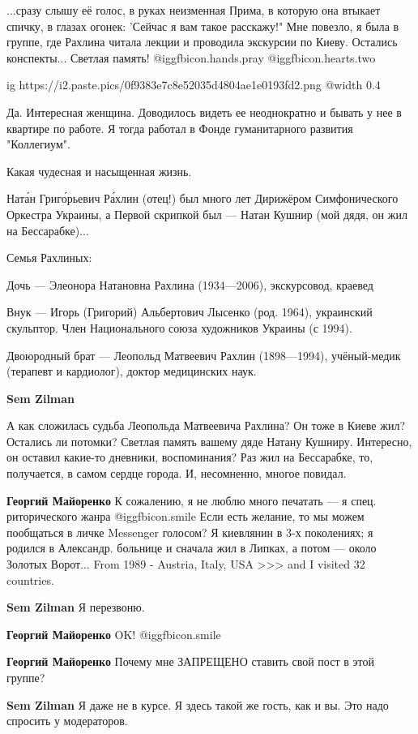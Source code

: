 \begin{itemize}

...сразу слышу её голос, в руках неизменная Прима, в которую она втыкает спичку, в глазах огонек: 'Сейчас я вам такое расскажу!"
Мне повезло, я была в группе, где Рахлина читала лекции и проводила экскурсии по Киеву. Остались конспекты...
Светлая память! @igg{fbicon.hands.pray}  @igg{fbicon.hearts.two} 


\ifcmt
  ig https://i2.paste.pics/0f9383e7c8e52035d4804ae1e0193fd2.png
  @width 0.4
\fi


Да. Интересная женщина. Доводилось видеть ее неоднократно и бывать у нее в
квартире по работе. Я тогда работал в Фонде гуманитарного развития "Коллегиум".


Какая чудесная и насыщенная жизнь.


Ната́н Григо́рьевич Ра́хлин (отец!) был много лет Дирижёром Симфонического
Оркестра Украины, а Первой скрипкой был — Натан Кушнир (мой дядя, он жил на
Бессарабке)...

Семья Рахлиных:

Дочь — Элеонора Натановна Рахлина (1934—2006), экскурсовод, краевед

Внук — Игорь (Григорий) Альбертович Лысенко (род. 1964), украинский скульптор.
Член Национального союза художников Украины (с 1994).

Двоюродный брат — Леопольд Матвеевич Рахлин (1898—1994), учёный-медик (терапевт
и кардиолог), доктор медицинских наук.

\begin{itemize} %
\textbf{Sem Zilman} 

А как сложилась судьба Леопольда Матвеевича Рахлина? Он тоже в Киеве жил?
Остались ли потомки? Светлая память вашему дяде Натану Кушниру. Интересно, он
оставил какие-то дневники, воспоминания? Раз жил на Бессарабке, то, получается,
в самом сердце города. И, несомненно, многое повидал.


\textbf{Георгий Майоренко} К сожалению, я не люблю много печатать — я спец. риторического жанра  @igg{fbicon.smile} 
Если есть желание, то мы можем пообщаться в личке Messenger голосом?
Я киевлянин в 3-х поколениях; я родился в Александр. больнице и сначала жил в Липках, а потом — около Золотых Ворот... From 1989 - Austria, Italy, USA >>> and I visited 32 countries.

\textbf{Sem Zilman} Я перезвоню.

\textbf{Георгий Майоренко} OK!  @igg{fbicon.smile} 

\textbf{Георгий Майоренко} Почему мне ЗАПРЕЩЕНО ставить свой пост в этой группе?

\textbf{Sem Zilman} Я даже не в курсе. Я здесь такой же гость, как и вы. Это надо спросить у модераторов.
\end{itemize} %


\end{itemize} %
